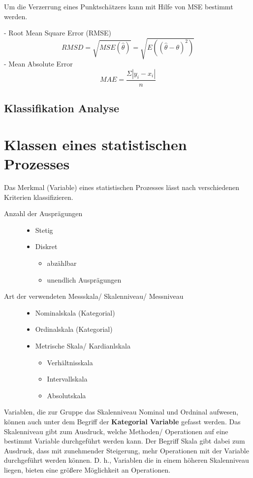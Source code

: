 Um die Verzerrung eines Punktschätzers kann mit Hilfe von \gls{MSE} bestimmt werden. 



- Root Mean Square Error (RMSE) $$RMSD= \sqrt{MSE(\hat{\theta})} = \sqrt{E((\hat{\theta}-\theta)^2)}$$
- Mean Absolute Error $$MAE = \frac{\Sigma |y_i - x_i|}{n}$$
\subsection{Klassifikation Analyse}


\section{Klassen eines statistischen Prozesses}
Das Merkmal (Variable) eines statistischen Prozesses lässt nach verschiedenen Kriterien klassifizieren.
\begin{description}
	\item[Anzahl der Ausprägungen] \: 
	\begin{itemize}
		\item Stetig
		\item Diskret
		\begin{itemize}
			\item abzählbar
			\item unendlich Ausprägungen
		\end{itemize} 
	\end{itemize}
	\item[Art der verwendeten Messskala/ Skalenniveau/ Messniveau] \:
	\begin{itemize}
		\item Nominalskala (Kategorial)
		\item Ordinalskala (Kategorial)
		\item Metrische Skala/ Kardianlskala
		\begin{itemize}
			\item Verhältnisskala
			\item Intervallskala
			\item Absolutskala
		\end{itemize} 	
	\end{itemize}
\end{description}

Variablen, die zur Gruppe das Skalenniveau Nominal und Ordninal aufwesen, können auch unter dem Begriff der \textbf{Kategorial Variable} gefasst werden. Das Skalenniveau gibt zum Ausdruck, welche Methoden/ Operationen auf eine bestimmt Variable durchgeführt werden kann. Der Begriff Skala gibt dabei zum Ausdruck, dass mit zunehmender Steigerung, mehr Operationen mit der Variable durchgeführt werden können. D. h., Variablen die in einem höheren Skalenniveau liegen, bieten eine größere Möglichkeit an Operationen.


